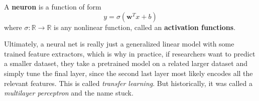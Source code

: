   \begin{definition}[Neuron]
    \label{def:neuron}
    A \textbf{neuron} is a function of form 
    \begin{equation}
      y = \sigma(\mathbf{w}^T x  + b)
    \end{equation}
    where $\sigma: \mathbb{R} \rightarrow \mathbb{R}$ is any nonlinear function, called an \textbf{activation functions}. 
  \end{definition}
  
  Ultimately, a neural net is really just a generalized linear model with some trained feature extractors, which is why in practice, if researchers want to predict a smaller dataset, they take a pretrained model on a related larger dataset and simply tune the final layer, since the second last layer most likely encodes all the relevant features. This is called \textit{transfer learning}. But historically, it was called a \textit{multilayer perceptron} and the name stuck. 

